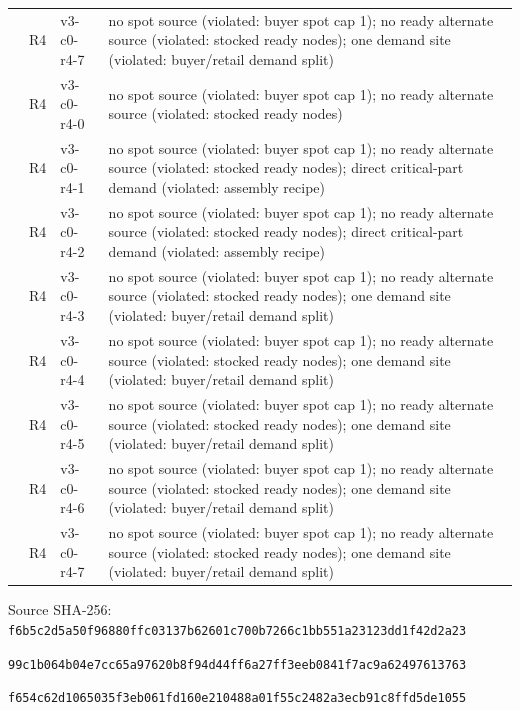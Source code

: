 \documentclass[preprint,11pt,authoryear]{elsarticle}
\newif\ifprovenance\provenancetrue
\begin{document}
\begin{longtable}{>{\raggedright\arraybackslash}p{0.6cm}>{\raggedright\arraybackslash}p{1.3cm}>{\raggedright\arraybackslash}p{5.4cm}>{\raggedright\arraybackslash}p{7.1cm}}
10 & R4 & v3-c0-r4-7 & no spot source (violated: buyer spot cap 1); no ready alternate source (violated: stocked ready nodes); one demand site (violated: buyer/retail demand split) \\
20 & R4 & v3-c0-r4-0 & no spot source (violated: buyer spot cap 1); no ready alternate source (violated: stocked ready nodes) \\
20 & R4 & v3-c0-r4-1 & no spot source (violated: buyer spot cap 1); no ready alternate source (violated: stocked ready nodes); direct critical-part demand (violated: assembly recipe) \\
20 & R4 & v3-c0-r4-2 & no spot source (violated: buyer spot cap 1); no ready alternate source (violated: stocked ready nodes); direct critical-part demand (violated: assembly recipe) \\
20 & R4 & v3-c0-r4-3 & no spot source (violated: buyer spot cap 1); no ready alternate source (violated: stocked ready nodes); one demand site (violated: buyer/retail demand split) \\
20 & R4 & v3-c0-r4-4 & no spot source (violated: buyer spot cap 1); no ready alternate source (violated: stocked ready nodes); one demand site (violated: buyer/retail demand split) \\
20 & R4 & v3-c0-r4-5 & no spot source (violated: buyer spot cap 1); no ready alternate source (violated: stocked ready nodes); one demand site (violated: buyer/retail demand split) \\
20 & R4 & v3-c0-r4-6 & no spot source (violated: buyer spot cap 1); no ready alternate source (violated: stocked ready nodes); one demand site (violated: buyer/retail demand split) \\
20 & R4 & v3-c0-r4-7 & no spot source (violated: buyer spot cap 1); no ready alternate source (violated: stocked ready nodes); one demand site (violated: buyer/retail demand split) \\
\end{longtable}
\ifprovenance\noindent\scriptsize Source SHA-256: \texttt{f6b5c2d5a50f96880ffc03137b62601c700b7266c1bb551a23123dd1f42d2a23}\par \texttt{99c1b064b04e7cc65a97620b8f94d44ff6a27ff3eeb0841f7ac9a62497613763}\par \texttt{f654c62d1065035f3eb061fd160e210488a01f55c2482a3ecb91c8ffd5de1055}\par\fi
\endgroup

\end{document}
